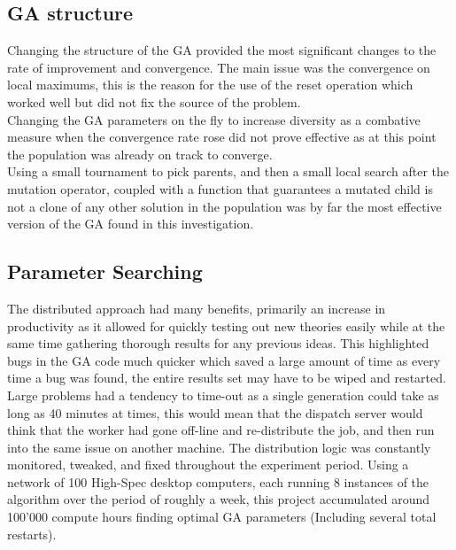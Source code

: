 \documentclass[14pt]{acmsiggraph}
\begin{document}
	\subsection{GA structure}
	Changing the structure of the GA provided the most significant changes to the rate of improvement and convergence.
	The main issue was the convergence on local maximums, this is the reason for the use of the reset operation which worked well but did not fix the source of the problem. \\
	Changing the GA parameters on the fly to increase diversity as a combative measure when the convergence rate rose did not prove effective as at this point the population was already on track to converge.\\
	Using a small tournament to pick parents, and then a  small local search after the mutation operator, coupled with a function that guarantees a mutated child is not a clone of any other solution in the population was by far the most effective version of the GA found in this investigation. \\
	
	\subsection {Parameter Searching}
	The distributed approach had many benefits, primarily an increase in productivity as it allowed for quickly testing out new theories easily while at the same time gathering thorough results for any previous ideas. This highlighted bugs in the GA code much quicker which saved a large amount of time as every time a bug was found, the entire results set may have to be wiped and restarted.
	\\
	Large problems had a tendency to time-out as a single generation could take as long as 40 minutes at times, this would mean that the dispatch server would think that the worker had gone off-line and re-distribute the job, and then run into the same issue on another machine. The distribution logic was constantly monitored, tweaked, and fixed throughout the experiment period. Using a network of 100 High-Spec desktop computers, each running 8 instances of the algorithm over the period of roughly a week, this project accumulated around 100'000 compute hours finding optimal GA parameters (Including several total restarts).
	
\end{document}
